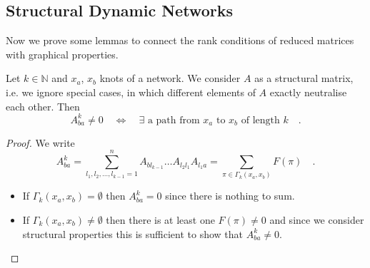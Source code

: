 \subsection{Structural Dynamic Networks}
Now we prove some lemmas to connect the rank conditions of reduced matrices with graphical 
properties.
%
%	
%	

\begin{lemma}{}{}
	Let $k\in\mathbb{N}$ and $x_a$, $x_b$ knots of a network. We consider $A$ as a 
	structural matrix, i.e. we ignore special cases, in which different elements of 
	$A$ exactly neutralise each other. Then
	\begin{equation}
	A^k_{ba} \neq 0 \quad \Leftrightarrow \quad \exists \text{ a path from } x_a 
	\text{ to } x_b \text{ of length }k \quad .
	\end{equation}
\end{lemma}
\begin{proof}
	We write 
	\begin{equation}
	A^k_{ba} = \sum\limits_{l_1,l_2,\ldots,l_{k-1}=1}^n A_{b l_{k-1}} \ldots A_{l_2 l_1} 
	A_{l_1 a} = \sum\limits_{\pi\in\Gamma_k(x_a,x_b)} F(\pi)
	 \quad .
	\end{equation}		
	\begin{itemize}
	\item If $\Gamma_k(x_a,x_b)=\emptyset$ then $A^k_{ba}=0$ since there is nothing to sum.
	\item If $\Gamma_k(x_a,x_b)\neq\emptyset$ then there is at least one $F(\pi)\neq 0$ and 
	since we consider structural properties this is sufficient to show that $A^k_{ba}\neq 
	0$.
	\end{itemize}		
\end{proof}


